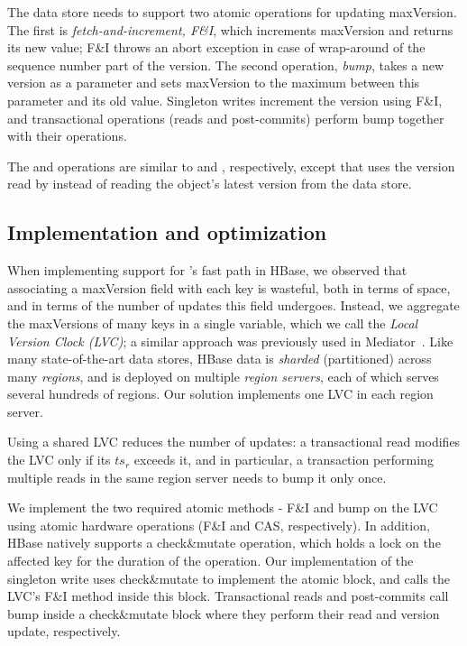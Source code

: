 The data store needs to support two atomic operations for updating {maxVersion}.
The first is \emph{fetch-and-increment, F\&I}, which increments {maxVersion} and returns its
new value; F\&I throws an abort exception in case of wrap-around of the 
sequence number part  of 
the version. The second operation, \emph{bump}, takes a new version  as a parameter and
sets  {maxVersion} to the maximum between this parameter and its old value.
Singleton writes  increment the version using F\&I, and transactional operations (reads and post-commits)
perform { bump} together with their operations. 

The   and  operations are similar to  and , 
respectively, except that  uses the version read by  instead of 
reading the object's latest  version from the data store.

\subsection{Implementation and optimization}
\label{ssec:fast-impl}

When implementing support for \sys's fast path in HBase, 
we observed that associating a maxVersion field with each key is wasteful,
both in terms of space, and in terms of the number of updates this field undergoes.
Instead, we aggregate the maxVersions of many keys in a single variable, 
which we call the \emph{Local Version Clock (LVC)};
a similar approach was previously used in Mediator~\cite{mediator}.
Like many state-of-the-art data stores, HBase data is \emph{sharded} (partitioned) 
across many \emph{regions}, and is deployed on multiple  \emph{region servers}, each of which serves
several hundreds of regions. Our solution implements one LVC in each region server. 

Using a shared LVC reduces the number of updates:  
a transactional read modifies the LVC only if its $ts_r$ exceeds it, and in particular, 
a transaction performing multiple reads in the same region server needs to bump it only once. 

We implement the two required atomic methods - F\&I and bump on the LVC using atomic hardware operations (F\&I and CAS, respectively). 
In addition, 
HBase   natively supports  a check\&mutate operation, which holds a lock on the affected key for the duration of the operation.
Our implementation of the singleton write uses  check\&mutate to implement the atomic block, and calls the LVC's F\&I method inside this block.
Transactional reads and post-commits call bump inside a check\&mutate  block where they perform their read and version update, respectively. 

